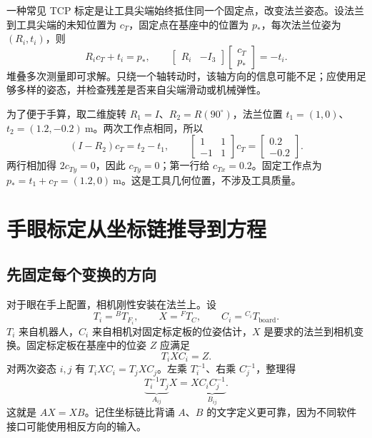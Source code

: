 一种常见 TCP 标定是让工具尖端始终抵住同一个固定点，改变法兰姿态。设法兰到工具尖端的未知位置为 $c_T$，固定点在基座中的位置为 $p_*$，每次法兰位姿为 $(R_i,t_i)$，则
\begin{equation}
 R_ic_T+t_i=p_*,\qquad
 \begin{bmatrix}R_i&-I_3\end{bmatrix}\begin{bmatrix}c_T\\p_*\end{bmatrix}=-t_i.
\end{equation}
堆叠多次测量即可求解。只绕一个轴转动时，该轴方向的信息可能不足；应使用足够多样的姿态，并检查残差是否来自尖端滑动或机械弹性。

\begin{examplebox}
为了便于手算，取二维旋转 $R_1=I$、$R_2=R(90^\circ)$，法兰位置 $t_1=(1,0)$、$t_2=(1.2,-0.2)\ \mathrm m$。两次工作点相同，所以
\[
 (I-R_2)c_T=t_2-t_1,\qquad
 \begin{bmatrix}1&1\\-1&1\end{bmatrix}c_T=\begin{bmatrix}0.2\\-0.2\end{bmatrix}.
\]
两行相加得 $2c_{Ty}=0$，因此 $c_{Ty}=0$；第一行给 $c_{Tx}=0.2$。固定工作点为 $p_*=t_1+c_T=(1.2,0)\ \mathrm m$。这是工具几何位置，不涉及工具质量。
\end{examplebox}

\section{手眼标定从坐标链推导到方程}
\subsection{先固定每个变换的方向}
对于眼在手上配置，相机刚性安装在法兰上。设
\[
 T_i={}^BT_{F_i},\qquad X={}^FT_C,\qquad C_i={} ^{C_i}T_{\mathrm{board}}.
\]
$T_i$ 来自机器人，$C_i$ 来自相机对固定标定板的位姿估计，$X$ 是要求的法兰到相机变换。固定标定板在基座中的位姿 $Z$ 应满足
\begin{equation}
 T_iXC_i=Z.
\end{equation}
对两次姿态 $i,j$ 有 $T_iXC_i=T_jXC_j$。左乘 $T_i^{-1}$、右乘 $C_j^{-1}$，整理得
\begin{equation}
 \underbrace{T_i^{-1}T_j}_{A_{ij}}X
 =X\underbrace{C_iC_j^{-1}}_{B_{ij}}.
\end{equation}
这就是 $AX=XB$。记住坐标链比背诵 $A$、$B$ 的文字定义更可靠，因为不同软件接口可能使用相反方向的输入。

